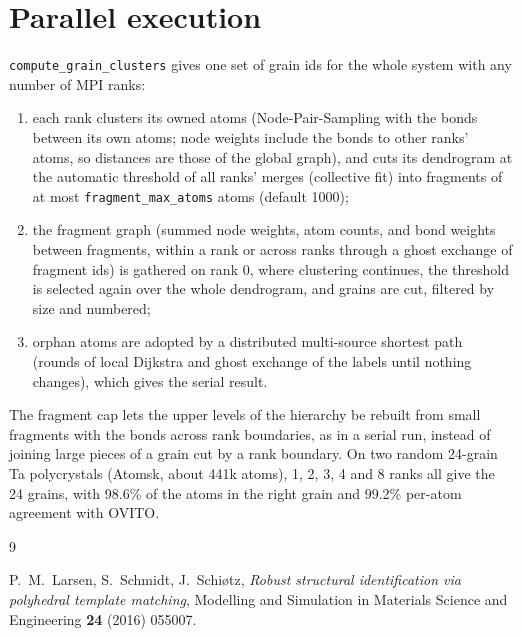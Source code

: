\documentclass[11pt,a4paper]{article}
\newcommand{\op}[1]{\texttt{#1}}
\begin{document}
\section{Parallel execution}

\op{compute\_grain\_clusters} gives one set of grain ids for the whole system with any number of
MPI ranks:
\begin{enumerate}[nosep]
  \item each rank clusters its owned atoms (Node-Pair-Sampling with the bonds between its own
    atoms; node weights include the bonds to other ranks' atoms, so distances are those of the
    global graph), and cuts its dendrogram at the automatic threshold of all ranks' merges
    (collective fit) into fragments of at most \texttt{fragment\_max\_atoms} atoms (default 1000);
  \item the fragment graph (summed node weights, atom counts, and bond weights between fragments,
    within a rank or across ranks through a ghost exchange of fragment ids) is gathered on rank 0,
    where clustering continues, the threshold is selected again over the whole dendrogram, and
    grains are cut, filtered by size and numbered;
  \item orphan atoms are adopted by a distributed multi-source shortest path (rounds of local
    Dijkstra and ghost exchange of the labels until nothing changes), which gives the serial result.
\end{enumerate}
The fragment cap lets the upper levels of the hierarchy be rebuilt from small fragments with the
bonds across rank boundaries, as in a serial run, instead of joining large pieces of a grain cut by
a rank boundary. On two random 24-grain Ta polycrystals (Atomsk, about 441k atoms), 1, 2, 3, 4 and
8 ranks all give the 24 grains, with 98.6\% of the atoms in the right grain and 99.2\% per-atom
agreement with OVITO.

\begin{thebibliography}{9}

P.~M.~Larsen, S.~Schmidt, J.~Schi\o{}tz,
\emph{Robust structural identification via polyhedral template matching},
Modelling and Simulation in Materials Science and Engineering \textbf{24} (2016) 055007.

\end{thebibliography}
\end{document}

